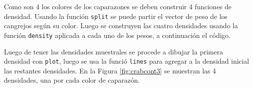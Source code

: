 \documentclass[
]{book}
\makeatletter
\newenvironment{Shaded}{\begin{snugshade}}{\end{snugshade}}
\newcommand{\AttributeTok}[1]{\textcolor[rgb]{0.77,0.63,0.00}{#1}}
\newcommand{\DecValTok}[1]{\textcolor[rgb]{0.00,0.00,0.81}{#1}}
\newcommand{\FunctionTok}[1]{\textcolor[rgb]{0.00,0.00,0.00}{#1}}
\newcommand{\NormalTok}[1]{#1}
\newcommand{\OtherTok}[1]{\textcolor[rgb]{0.56,0.35,0.01}{#1}}
\newcommand{\SpecialCharTok}[1]{\textcolor[rgb]{0.00,0.00,0.00}{#1}}
\newenvironment{kframe}{%
\medskip{}
\setlength{\fboxsep}{.8em}
 \def\at@end@of@kframe{}%
 \ifinner\ifhmode%
  \def\at@end@of@kframe{\end{minipage}}%
  \begin{minipage}{\columnwidth}%
 \fi\fi%
 \def\FrameCommand##1{\hskip\@totalleftmargin \hskip-\fboxsep
 \colorbox{shadecolor}{##1}\hskip-\fboxsep
     \hskip-\linewidth \hskip-\@totalleftmargin \hskip\columnwidth}%
 \MakeFramed {\advance\hsize-\width
   \@totalleftmargin\z@ \linewidth\hsize
   \@setminipage}}%
 {\par\unskip\endMakeFramed%
 \at@end@of@kframe}
\renewenvironment{Shaded}{\begin{kframe}}{\end{kframe}}
\makeatother
\begin{document}
Como son 4 los colores de los caparazones se deben construir 4 funciones de densidad. Usando la función \texttt{split} se puede partir el vector de peso de los cangrejos según su color. Luego se construyen las cuatro densidades usando la función \texttt{density} aplicada a cada uno de los pesos, a continuación el código.

\begin{Shaded}
\end{Shaded}

Luego de tener las densidades muestrales se procede a dibujar la primera densidad con \texttt{plot}, luego se usa la funció \texttt{lines} para agregar a la densidad inicial las restantes densidades. En la Figura \ref{fig:crabcont3} se muestran las 4 densidades, una por cada color de caparazón.
\end{document}
